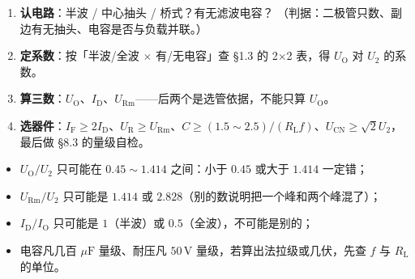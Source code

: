 \documentclass[11pt]{ctexart}
\begin{document}

\begin{enumerate}
\item \textbf{认电路}：半波 / 中心抽头 / 桥式？有无滤波电容？
（判据：二极管只数、副边有无抽头、电容是否与负载并联。）
\item \textbf{定系数}：按「半波/全波 $\times$ 有/无电容」查 §1.3 的 2$\times$2 表，得 $U_{\mathrm{O}}$ 对 $U_2$ 的系数。
\item \textbf{算三数}：$U_{\mathrm{O}}$、$I_{\mathrm{D}}$、$U_{\mathrm{Rm}}$——后两个是选管依据，不能只算 $U_{\mathrm{O}}$。
\item \textbf{选器件}：$I_{\mathrm{F}}\ge2I_{\mathrm{D}}$、$U_{\mathrm{R}}\ge U_{\mathrm{Rm}}$、$C\ge(1.5\sim2.5)/(R_{\mathrm{L}}f)$、$U_{\mathrm{CN}}\ge\sqrt2U_2$，最后做 §8.3 的量级自检。
\end{enumerate}


\begin{itemize}
\item $U_{\mathrm{O}}/U_2$ 只可能在 $0.45\sim1.414$ 之间：小于 $0.45$ 或大于 $1.414$ 一定错；
\item $U_{\mathrm{Rm}}/U_2$ 只可能是 $1.414$ 或 $2.828$（别的数说明把一个峰和两个峰混了）；
\item $I_{\mathrm{D}}/I_{\mathrm{O}}$ 只可能是 $1$（半波）或 $0.5$（全波），不可能是别的；
\item 电容凡几百 $\mu\mathrm{F}$ 量级、耐压凡 $50\,\mathrm{V}$ 量级，若算出法拉级或几伏，先查 $f$ 与 $R_{\mathrm{L}}$ 的单位。
\end{itemize}




\end{document}
